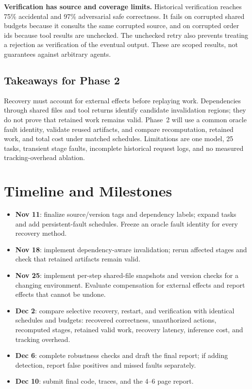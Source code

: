 \documentclass[10pt,twocolumn,letterpaper]{article}
\begin{document}
\begin{samepage}
\textbf{Verification has source and coverage limits.} Historical verification
reaches 75\% accidental and 97\% adversarial safe correctness. It fails on
corrupted shared budgets because it consults the same corrupted source,
and on corrupted order ids because tool results are unchecked. The unchecked
retry also prevents treating a rejection as verification of the eventual
output. These are scoped results, not guarantees against arbitrary agents.\par
\end{samepage}

\begin{samepage}
\section{Takeaways for Phase 2}
Recovery must account for external effects before replaying work.
Dependencies through shared files and tool returns identify candidate
invalidation regions; they do not prove that retained work remains valid.
Phase~2 will use a common oracle fault identity, validate reused artifacts,
and compare recomputation, retained work, and total cost under matched
schedules. Limitations are one model, 25 tasks, transient stage faults,
incomplete historical request logs, and no measured tracking-overhead
ablation.\par
\end{samepage}

\clearpage
\appendix
\section{Timeline and Milestones}
\begin{itemize}
\item \textbf{Nov 11}: finalize source/version tags and dependency labels;
expand tasks and add persistent-fault schedules. Freeze an oracle fault
identity for every recovery method.
\item \textbf{Nov 18}: implement dependency-aware invalidation; rerun
affected stages and check that retained artifacts remain valid.
\item \textbf{Nov 25}: implement per-step shared-file snapshots and
version checks for a changing environment. Evaluate compensation for
external effects and report effects that cannot be undone.
\item \textbf{Dec 2}: compare selective recovery, restart, and verification
with identical schedules and budgets: recovered correctness, unauthorized
actions, recomputed stages, retained valid work, recovery latency, inference
cost, and tracking overhead.
\item \textbf{Dec 6}: complete robustness checks and draft the final report;
if adding detection, report false positives and missed faults separately.
\item \textbf{Dec 10}: submit final code, traces, and the 4--6 page report.
\end{itemize}
\end{document}
